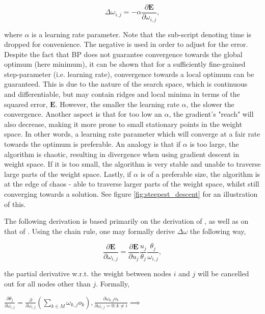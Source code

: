 \begin{equation}
    \Delta \omega_{i,j} = -\alpha \frac{\partial \textbf{E}}{\partial \omega_{i,j}},
\end{equation}

where $\alpha$ is a learning rate parameter. Note that the sub-script denoting time is dropped for convenience.
The negative is used in order to adjust for the error. Despite the fact that BP does not guarantee convergence towards the global optimum (here minimum), it can be shown that for a sufficiently fine-grained step-parameter (i.e. learning rate), convergence towards a local optimum can be guaranteed. This is due to the nature of the search space, which is continuous and differentiable, but may contain ridges and local minima in terms of the squared error, $\textbf{E}$. However, the smaller the learning rate $\alpha$, the slower the convergence. Another aspect is that for too low an $\alpha$, the gradient's "reach" will also decrease, making it more prone to small stationary points in the weight space. In other words, a learning rate parameter which will converge at a fair rate towards the optimum is preferable. An analogy is that if $\alpha$ is too large, the algorithm is chaotic, resulting in divergence when using gradient descent in weight space. If it is too small, the algorithm is very stable and unable to traverse large parts of the weight space. Lastly, if $\alpha$ is of a preferable size, the algorithm is at the edge of chaos - able to traverse larger parts of the weight space, whilst still converging towards a solution. See figure \ref{fig:steepest_descent} for an illustration of this.

The following derivation is based primarily on the derivation of \cite{Rumelhart1986}, as well as on that of \cite{Russell2009}.
Using the chain rule, one may formally derive $\Delta \omega$ the following way,

\begin{equation}
    \frac{\partial \textbf{E}}{\partial \omega_{i,j}} = \frac{\partial \textbf{E}}{\partial u_j}
    \frac{u_j}{\theta_{j}}
    \frac{\theta_{j}}{\omega_{i,j}},
\end{equation}

the partial derivative w.r.t. the weight between nodes $i$ and $j$ will be cancelled out for all nodes other than $j$. Formally,

\begin{center}
\begin{math}
    \frac{\partial \theta_j}{\partial \omega_{i,j}} = \frac{\partial}{\partial \omega_{i,j}}(\sum_{k \in M}{} \omega_{k,j}o_k),
    \frac{\partial \omega_{k,j}o_k}{\partial \omega_{i,j} = 0 : k \neq i}
    \implies
\end{math}
\end{center}

